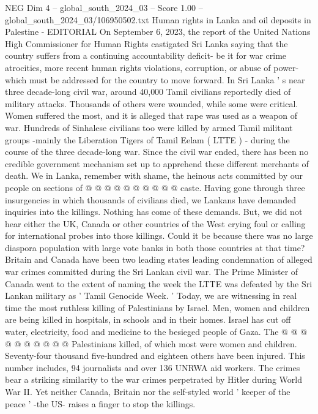 \begin{textsample}{NEG Dim 4 – global\_south\_2024\_03 – Score 1.00 – global\_south\_2024\_03/106950502.txt}  \label{ex:f4_neg_360}
Human rights in Lanka and oil deposits in Palestine - EDITORIAL On September 6, 2023, the report of the United Nations High Commissioner for Human Rights castigated Sri Lanka saying that the country suffers from a continuing accountability deficit- be it for war crime atrocities, more recent human rights violations, corruption, or abuse of power- which must be addressed for the country to move forward.
In Sri Lanka ' s near three decade-long civil war, around 40,000 Tamil civilians reportedly died of military attacks.
Thousands of others were wounded, while some were critical.
Women suffered the most, and it is alleged that rape was used as a weapon of war.
Hundreds of Sinhalese civilians too were killed by armed Tamil militant groups -mainly the Liberation Tigers of Tamil Eelam ( LTTE ) - during the course of the three decade-long war.
Since the civil war ended, there has been no credible government mechanism set up to apprehend these different merchants of death.
We in Lanka, remember with shame, the heinous acts committed by our people on sections of @ @ @ @ @ @ @ @ @ @ caste.
Having gone through three insurgencies in which thousands of civilians died, we Lankans have demanded inquiries into the killings.
Nothing has come of these demands.
But, we did not hear either the UK, Canada or other countries of the West crying foul or calling for international probes into those killings.
Could it be because there was no large diaspora population with large vote banks in both those countries at that time?
Britain and Canada have been two leading states leading condemnation of alleged war crimes committed during the Sri Lankan civil war.
The Prime Minister of Canada went to the extent of naming the week the LTTE was defeated by the Sri Lankan military as ' Tamil Genocide Week. ' Today, we are witnessing in real time the most ruthless killing of Palestinians by Israel.
Men, women and children are being killed in hospitals, in schools and in their homes.
Israel has cut off water, electricity, food and medicine to the besieged people of Gaza.
The @ @ @ @ @ @ @ @ @ @ Palestinians killed, of which most were women and children.
Seventy-four thousand five-hundred and eighteen others have been injured.
This number includes, 94 journalists and over 136 UNRWA aid workers.
The crimes bear a striking similarity to the war crimes perpetrated by Hitler during World War II.
Yet neither Canada, Britain nor the self-styled world ' keeper of the peace ' -the US- raises a finger to stop the killings.

\end{textsample}
